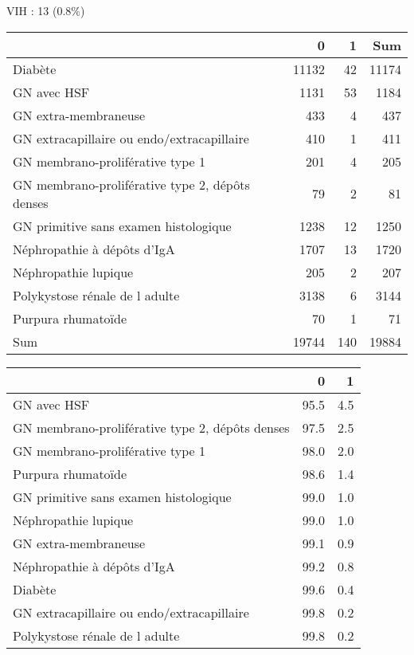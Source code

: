 \documentclass[11pt,a4paper]{article}\usepackage[]{graphicx}\usepackage[]{color}
\begin{document}
VIH : 13 (0.8\%)
\begin{table}[H]
\centering
\begin{tabular}{lrrr}
  \hline
 & 0 & 1 & Sum \\ 
  \hline
Diabète & 11132 & 42 & 11174 \\ 
  GN avec HSF & 1131 & 53 & 1184 \\ 
  GN extra-membraneuse & 433 & 4 & 437 \\ 
  GN extracapillaire ou endo/extracapillaire & 410 & 1 & 411 \\ 
  GN membrano-proliférative type 1 & 201 & 4 & 205 \\ 
  GN membrano-proliférative type 2, dépôts denses & 79 & 2 & 81 \\ 
  GN primitive sans examen histologique & 1238 & 12 & 1250 \\ 
  Néphropathie à dépôts d'IgA & 1707 & 13 & 1720 \\ 
  Néphropathie lupique & 205 & 2 & 207 \\ 
  Polykystose rénale de l adulte & 3138 & 6 & 3144 \\ 
  Purpura rhumatoïde & 70 & 1 & 71 \\ 
  Sum & 19744 & 140 & 19884 \\ 
   \hline
\end{tabular}
\end{table}
\begin{table}[H]
\centering
\begin{tabular}{lrr}
  \hline
 & 0 & 1 \\ 
  \hline
GN avec HSF & 95.5 & 4.5 \\ 
  GN membrano-proliférative type 2, dépôts denses & 97.5 & 2.5 \\ 
  GN membrano-proliférative type 1 & 98.0 & 2.0 \\ 
  Purpura rhumatoïde & 98.6 & 1.4 \\ 
  GN primitive sans examen histologique & 99.0 & 1.0 \\ 
  Néphropathie lupique & 99.0 & 1.0 \\ 
  GN extra-membraneuse & 99.1 & 0.9 \\ 
  Néphropathie à dépôts d'IgA & 99.2 & 0.8 \\ 
  Diabète & 99.6 & 0.4 \\ 
  GN extracapillaire ou endo/extracapillaire & 99.8 & 0.2 \\ 
  Polykystose rénale de l adulte & 99.8 & 0.2 \\ 
   \hline
\end{tabular}
\end{table}
\end{document}
